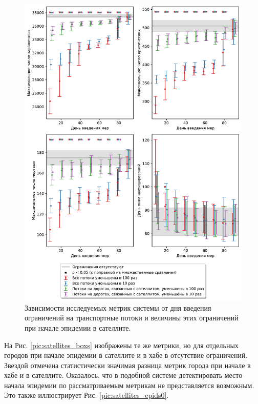 \documentclass[a4paper,12pt]{article} %
\begin{document}
\begin{figure}[H]
    \centering
    \includegraphics[width=\linewidth]{images/satellites_hists1.pdf}
    \caption{Зависимости исследуемых метрик системы от дня введения ограничений на транспортные потоки и величины этих ограничений при начале эпидемии в сателлите.}
    \label{pic:satellites_hists1}
\end{figure}

На Рис. \ref{pic:satellites_boxs} изображены те же метрики, но для отдельных городов при начале эпидемии в сателлите и в хабе в отсутствие ограничений. Звездой отмечена статистически значимая разница метрик города при начале в хабе и в сателлите. Оказалось, что в подобной системе детектировать место начала эпидемии по рассматриваемым метрикам не представляется возможным. Это также иллюстрирует Рис. \ref{pic:satellites_epids0}.
\end{document}
